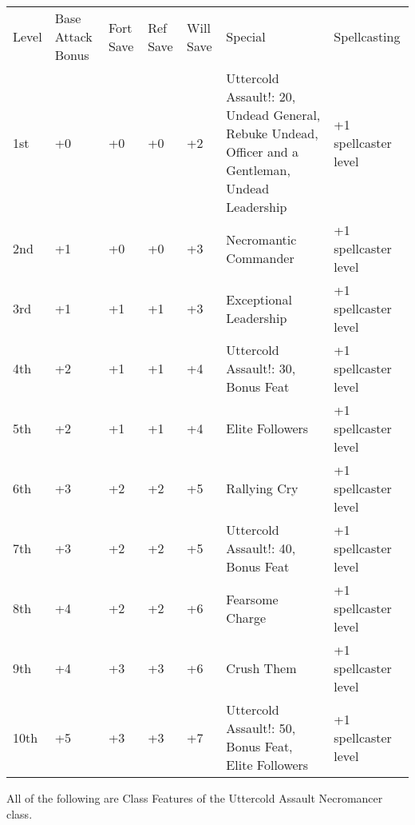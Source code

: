 



\begin{table}[tbh]
\begin{small}
\begin{tabular}{lp{1.9cm}p{0.7cm}p{0.7cm}p{0.7cm}p{6cm}l}
Level  &Base Attack Bonus &Fort Save &Ref Save &Will Save &Special &Spellcasting\\
1st &+0 &+0 &+0 &+2 &Uttercold Assault!: 20, Undead General, Rebuke Undead, Officer and a Gentleman, Undead Leadership &+1 spellcaster level\\
2nd &+1 &+0 &+0 &+3 &Necromantic Commander &+1 spellcaster level\\
3rd &+1 &+1 &+1 &+3 &Exceptional Leadership &+1 spellcaster level\\
4th &+2 &+1 &+1 &+4 &Uttercold Assault!: 30, Bonus Feat &+1 spellcaster level\\
5th &+2 &+1 &+1 &+4 &Elite Followers &+1 spellcaster level\\
6th &+3 &+2 &+2 &+5 &Rallying Cry &+1 spellcaster level\\
7th &+3 &+2 &+2 &+5 &Uttercold Assault!: 40, Bonus Feat &+1 spellcaster level\\
8th &+4 &+2 &+2 &+6 &Fearsome Charge &+1 spellcaster level\\
9th &+4 &+3 &+3 &+6 &Crush Them &+1 spellcaster level\\
10th &+5 &+3 &+3 &+7 &Uttercold Assault!: 50, Bonus Feat, Elite Followers &+1 spellcaster level\\
\end{tabular}
\end{small}
\end{table}

\smallskip\noindent All of the following are Class Features of the Uttercold Assault Necromancer class.



